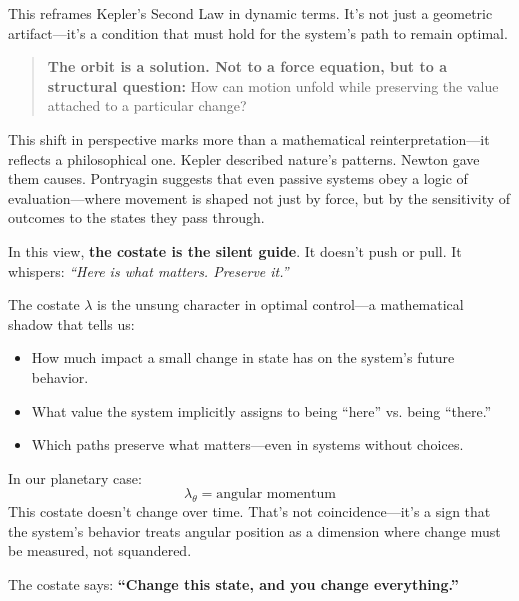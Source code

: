 This reframes Kepler’s Second Law in dynamic terms. It’s not just a geometric artifact—it’s a condition that must hold for the system’s path to remain optimal.

\begin{quote}
\textbf{The orbit is a solution. Not to a force equation, but to a structural question:}  
How can motion unfold while preserving the value attached to a particular change?
\end{quote}

This shift in perspective marks more than a mathematical reinterpretation—it reflects a philosophical one. Kepler described nature’s patterns. Newton gave them causes. Pontryagin suggests that even passive systems obey a logic of evaluation—where movement is shaped not just by force, but by the sensitivity of outcomes to the states they pass through.

In this view, \textbf{the costate is the silent guide}. It doesn't push or pull. It whispers:  
\textit{“Here is what matters. Preserve it.”}

\begin{tcolorbox}[colback=blue!5!white, colframe=blue!50!black,
title={Sidebar: What the Costate Really Means}]
The costate \( \lambda \) is the unsung character in optimal control—a mathematical shadow that tells us:

\begin{itemize}
  \item How much impact a small change in state has on the system’s future behavior.
  \item What value the system implicitly assigns to being “here” vs. being “there.”
  \item Which paths preserve what matters—even in systems without choices.
\end{itemize}

In our planetary case:
\[
\lambda_\theta = \text{angular momentum}
\]
This costate doesn’t change over time. That’s not coincidence—it’s a sign that the system’s behavior treats angular position as a dimension where change must be measured, not squandered.

The costate says:  
\textbf{“Change this state, and you change everything.”}
\end{tcolorbox}


